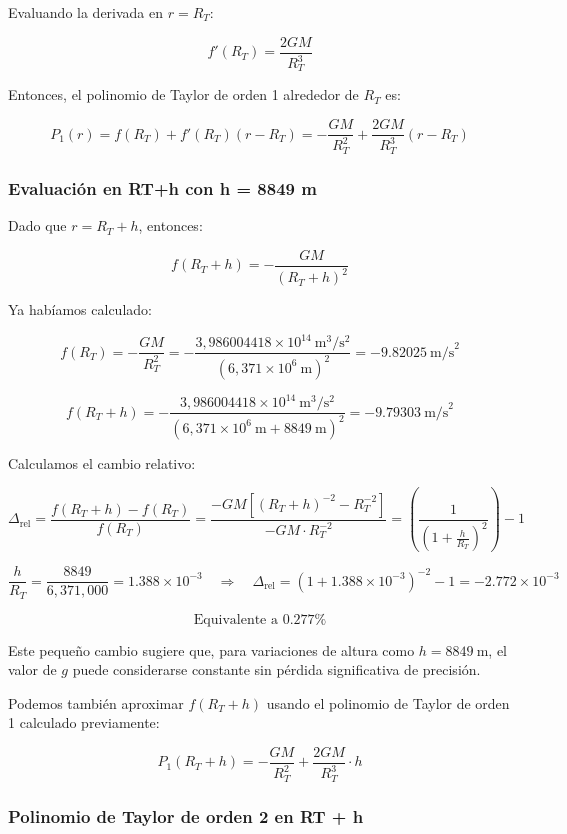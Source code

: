 \documentclass{article}
\begin{document}
Evaluando la derivada en $r = R_T$:

\[
f'(R_T) = \frac{2GM}{R_T^3}
\]

Entonces, el polinomio de Taylor de orden 1 alrededor de $R_T$ es:

\[
P_1(r) = f(R_T) + f'(R_T)(r - R_T) = -\frac{GM}{R_T^2} + \frac{2GM}{R_T^3}(r - R_T)
\]

\subsubsection{Evaluación en RT+h con h = 8849 m}

Dado que $r = R_T + h$, entonces:

\[
f(R_T + h) = -\frac{GM}{(R_T + h)^2}
\]

Ya habíamos calculado:

\[
f(R_T) = -\frac{GM}{R_T^2} = -\frac{3{,}986004418 \times 10^{14}\ \text{m}^3/\text{s}^2}{(6{,}371 \times 10^6\ \text{m})^2} = -9.82025\ \text{m/s}^2
\]

\[
f(R_T + h) = -\frac{3{,}986004418 \times 10^{14}\ \text{m}^3/\text{s}^2}{(6{,}371 \times 10^6\ \text{m} + 8849\ \text{m})^2} = -9.79303\ \text{m/s}^2
\]

Calculamos el cambio relativo:

\[
\Delta_{\text{rel}} = \frac{f(R_T + h) - f(R_T)}{f(R_T)} = \frac{-GM[(R_T + h)^{-2} - R_T^{-2}]}{-GM \cdot R_T^{-2}} = \left( \frac{1}{(1 + \frac{h}{R_T})^2} \right) - 1
\]

\[
\frac{h}{R_T} = \frac{8849}{6{,}371{,}000} = 1.388 \times 10^{-3}
\quad \Rightarrow \quad
\Delta_{\text{rel}} = (1 + 1.388 \times 10^{-3})^{-2} - 1 = -2.772 \times 10^{-3}
\]

\[
\text{Equivalente a } 0.277\%
\]

\noindent
Este pequeño cambio sugiere que, para variaciones de altura como $h = 8849\ \text{m}$, el valor de $g$ puede considerarse constante sin pérdida significativa de precisión.

\vspace{0.5em}
\noindent
Podemos también aproximar $f(R_T + h)$ usando el polinomio de Taylor de orden 1 calculado previamente:

\[
P_1(R_T + h) = -\frac{GM}{R_T^2} + \frac{2GM}{R_T^3} \cdot h
\]

\subsubsection{Polinomio de Taylor de orden 2 en RT + h}
\end{document}
